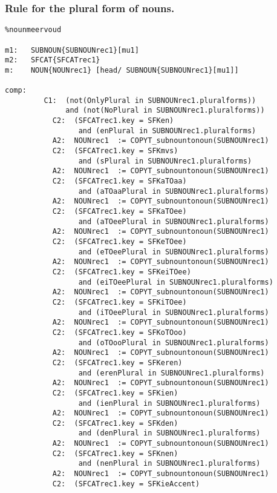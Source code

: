 \subsubsection{Rule for the plural form of nouns.}
\begin{verbatim}
%nounmeervoud

m1:   SUBNOUN{SUBNOUNrec1}[mu1]
m2:   SFCAT{SFCATrec1}
m:    NOUN{NOUNrec1} [head/ SUBNOUN{SUBNOUNrec1}[mu1]]

comp:    
         C1:  (not(OnlyPlural in SUBNOUNrec1.pluralforms)) 
              and (not(NoPlural in SUBNOUNrec1.pluralforms)) 
           C2:  (SFCATrec1.key = SFKen) 
                 and (enPlural in SUBNOUNrec1.pluralforms)
           A2:  NOUNrec1  := COPYT_subnountonoun(SUBNOUNrec1)
           C2:  (SFCATrec1.key = SFKmvs) 
                 and (sPlural in SUBNOUNrec1.pluralforms)
           A2:  NOUNrec1  := COPYT_subnountonoun(SUBNOUNrec1)
           C2:  (SFCATrec1.key = SFKaTOaa) 
                 and (aTOaaPlural in SUBNOUNrec1.pluralforms)
           A2:  NOUNrec1  := COPYT_subnountonoun(SUBNOUNrec1)
           C2:  (SFCATrec1.key = SFKaTOee) 
                 and (aTOeePlural in SUBNOUNrec1.pluralforms)
           A2:  NOUNrec1  := COPYT_subnountonoun(SUBNOUNrec1)
           C2:  (SFCATrec1.key = SFKeTOee)
                 and (eTOeePlural in SUBNOUNrec1.pluralforms)
           A2:  NOUNrec1  := COPYT_subnountonoun(SUBNOUNrec1)
           C2:  (SFCATrec1.key = SFKeiTOee) 
                 and (eiTOeePlural in SUBNOUNrec1.pluralforms)
           A2:  NOUNrec1  := COPYT_subnountonoun(SUBNOUNrec1)
           C2:  (SFCATrec1.key = SFKiTOee) 
                 and (iTOeePlural in SUBNOUNrec1.pluralforms)
           A2:  NOUNrec1  := COPYT_subnountonoun(SUBNOUNrec1)
           C2:  (SFCATrec1.key = SFKoTOoo) 
                 and (oTOooPlural in SUBNOUNrec1.pluralforms)
           A2:  NOUNrec1  := COPYT_subnountonoun(SUBNOUNrec1)
           C2:  (SFCATrec1.key = SFKeren) 
                 and (erenPlural in SUBNOUNrec1.pluralforms)
           A2:  NOUNrec1  := COPYT_subnountonoun(SUBNOUNrec1)
           C2:  (SFCATrec1.key = SFKien) 
                 and (ienPlural in SUBNOUNrec1.pluralforms)
           A2:  NOUNrec1  := COPYT_subnountonoun(SUBNOUNrec1)
           C2:  (SFCATrec1.key = SFKden) 
                 and (denPlural in SUBNOUNrec1.pluralforms)
           A2:  NOUNrec1  := COPYT_subnountonoun(SUBNOUNrec1)
           C2:  (SFCATrec1.key = SFKnen) 
                 and (nenPlural in SUBNOUNrec1.pluralforms)
           A2:  NOUNrec1  := COPYT_subnountonoun(SUBNOUNrec1)
           C2:  (SFCATrec1.key = SFKieAccent) 

\end{verbatim}
